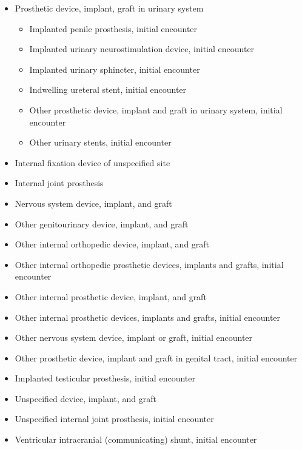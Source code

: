 \begin{itemize}
\begin{itemize}
        \item Prosthetic device, implant, graft in urinary system
        \begin{itemize}
            \item Implanted penile prosthesis, initial encounter
            \item Implanted urinary neurostimulation device, initial encounter
            \item Implanted urinary sphincter, initial encounter
            \item Indwelling ureteral stent, initial encounter
            \item Other prosthetic device, implant and graft in urinary system, initial encounter
            \item Other urinary stents, initial encounter
        \end{itemize}
        
        \item Internal fixation device of unspecified site
        \item Internal joint prosthesis
        \item Nervous system device, implant, and graft
        \item Other genitourinary device, implant, and graft
        \item Other internal orthopedic device, implant, and graft
        \item Other internal orthopedic prosthetic devices, implants and grafts, initial encounter
        \item Other internal prosthetic device, implant, and graft
        \item Other internal prosthetic devices, implants and grafts, initial encounter
        \item Other nervous system device, implant or graft, initial encounter
        \item Other prosthetic device, implant and graft in genital tract, initial encounter
        \item Implanted testicular prosthesis, initial encounter
        \item Unspecified device, implant, and graft
        \item Unspecified internal joint prosthesis, initial encounter
        \item Ventricular intracranial (communicating) shunt, initial encounter
        
    \end{itemize}
    

\end{itemize}
